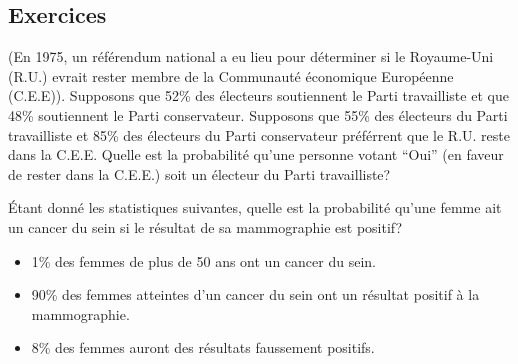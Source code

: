 \subsection*{Exercices}
\begin{Exercice}%
\label{ex1.4.1}
(En 1975, un référendum national a eu lieu pour d\'eterminer si le Royaume-Uni (R.U.) evrait rester membre de la Communauté économique Européenne (C.E.E)). Supposons que 52\% des électeurs soutiennent le Parti travailliste et que 48\% soutiennent le Parti conservateur. Supposons que 55\% des électeurs du Parti travailliste et 85\% des \'electeurs du Parti conservateur pr\'ef\'errent que le R.U. reste dans la C.E.E. Quelle est la probabilité qu'une personne votant ``Oui'' (en faveur de rester dans la C.E.E.) soit un électeur du Parti travailliste?	\cite{BDA_H}	
\end{Exercice} 

\begin{Exercice} %
 \label{ex1.4.2}					
 Étant donné les statistiques suivantes, quelle est la probabilité qu'une femme ait un cancer du sein si le résultat de sa mammographie est positif? \cite{BDA_N6}
\begin{itemize}[noitemsep]
	\item 1\% des femmes de plus de 50 ans ont un cancer du sein.
	\item 90\% des femmes atteintes d'un cancer du sein ont un résultat positif à la mammographie.
	\item 8\% des femmes auront des résultats faussement positifs.
\end{itemize}	
\end{Exercice} 

